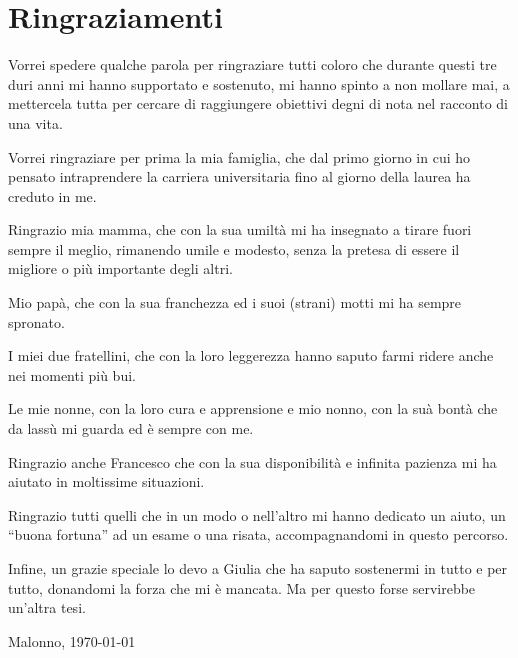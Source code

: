 \documentclass[12pt,a4paper,openright]{book} %
\begin{document}
\chapter{Ringraziamenti}
\resetsecnumdepth

Vorrei spedere qualche parola per ringraziare tutti coloro che durante
questi tre duri anni mi hanno supportato e sostenuto, mi hanno spinto
a non mollare mai, a mettercela tutta per cercare di raggiungere
obiettivi degni di nota nel racconto di una vita.

\bigskip

Vorrei ringraziare per prima la mia famiglia, che dal primo giorno in
cui ho pensato intraprendere la carriera universitaria fino al giorno
della laurea ha creduto in me.

Ringrazio mia mamma, che con la sua umiltà mi ha insegnato a tirare
fuori sempre il meglio, rimanendo umile e modesto, senza la pretesa di
essere il migliore o più importante degli altri.

Mio papà, che con la sua franchezza ed i suoi (strani) motti mi ha
sempre spronato.

I miei due fratellini, che con la loro leggerezza hanno saputo farmi
ridere anche nei momenti più bui.

Le mie nonne, con la loro cura e apprensione e mio nonno, con la suà
bontà che da lassù mi guarda ed è sempre con me.

\bigskip

Ringrazio anche Francesco che con la sua disponibilità e infinita
pazienza mi ha aiutato in moltissime situazioni.

\bigskip

Ringrazio tutti quelli che in un modo o nell'altro mi hanno dedicato
un aiuto, un ``buona fortuna'' ad un esame o una risata,
accompagnandomi in questo percorso.

\bigskip

Infine, un grazie speciale lo devo a Giulia che ha saputo sostenermi
in tutto e per tutto, donandomi la forza che mi è mancata. Ma per
questo forse servirebbe un'altra tesi.

\bigskip
\bigskip

\begin{flushright}
	Malonno, \today
\end{flushright}



\listoffigures
\listofalgorithms



\printbibliography
{}
\end{document}
